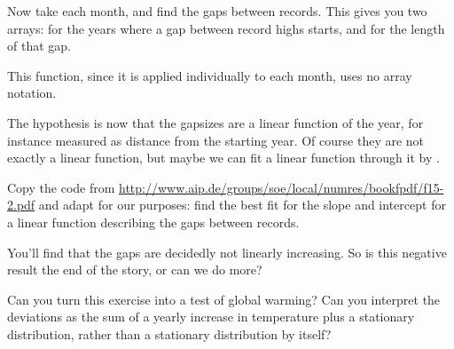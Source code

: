 \begin{exercise}
  Now take each month, and find the gaps between records. This gives
  you two arrays:  for the years where a gap between
  record highs starts, and  for the length of that gap.

  This function, since it is applied individually to each month, uses
  no array notation.
\end{exercise}

The hypothesis is now that the gapsizes are a linear function of the
year, for instance measured as distance from the starting year. Of
course they are not exactly a linear function, but maybe we can fit a
linear function through it by .

\begin{exercise}
  Copy the code from
  \url{http://www.aip.de/groups/soe/local/numres/bookfpdf/f15-2.pdf} and
  adapt for our purposes: find the best fit for the slope and
  intercept for a linear function describing the gaps between records.
\end{exercise}

You'll find that the gaps are decidedly not linearly increasing.
So is this negative result the end of the story, or can we do more?

\begin{exercise}
  Can you turn this exercise into a test of global warming? Can you
  interpret the deviations as the sum of a yearly increase in temperature
  plus a stationary distribution, rather than a stationary
  distribution by itself?
\end{exercise}
